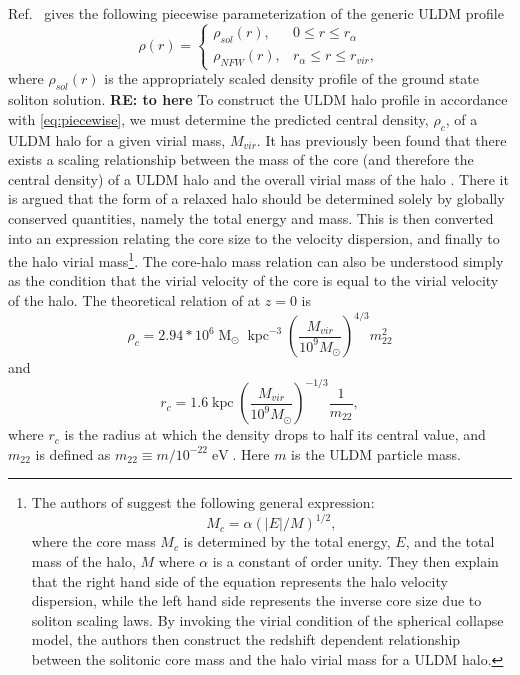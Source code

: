 \documentclass[a4paper,11pt]{article}
\newcommand{\re}[1]{{{\bf \color{green} RE: #1}}}
\begin{document}
\

 
Ref.~\cite{Robles:2018fur} gives the following piecewise parameterization of the generic ULDM profile 
%
\begin{equation}\label{eq:piecewise}
     \rho(r)=
    \begin{cases}
      \rho_{sol}(r), & 0\leq r \leq r_{\alpha} \\
      \rho_{NFW}(r), & r_{\alpha}\leq r \leq r_{vir},
    \end{cases}
\end{equation}
%
where $\rho_{sol}(r)$ is the appropriately scaled density profile of the ground state soliton solution.   \re{to here}
To construct the ULDM halo profile in accordance with \ref{eq:piecewise}, we must determine the predicted central density, $\rho_c$, of a ULDM halo for a given virial mass, $M_{vir}$.  It has previously been found that there exists a scaling relationship between the mass of the core (and therefore the central density) of a ULDM halo and the overall virial mass of the halo \cite{Schive:2014hza}. There it is argued that the form of a relaxed halo should be determined solely by globally conserved quantities, namely the total energy and mass. This is then converted into an expression relating the core size to the velocity dispersion, and finally to the halo virial mass\footnote{The authors of \cite{Schive:2014hza} suggest the following general expression:
\begin{equation}
    M_c = \alpha \left(\vert E\vert/M\right)^{1/2},
\end{equation}
where the core mass $M_c$ is determined by the total energy, $E$, and the total mass of the halo, $M$ where $\alpha$ is a constant of order unity. They then explain that the right hand side of the equation represents the halo velocity dispersion, while the left hand side  represents the inverse core size due to soliton scaling laws. By invoking the virial condition of the spherical collapse model, the authors then  construct the redshift dependent relationship between the solitonic core mass and the halo virial mass for a ULDM halo.}. The core-halo mass relation can also be understood simply as the condition that the virial velocity of the core is equal to the virial velocity of the halo. The theoretical relation of \cite{Schive:2014hza} at $z = 0$ is  
%
\begin{equation}\label{eq:central_dens}
    \rho_c = 2.94*10^6 \operatorname{M}_{\odot}\operatorname{kpc}^{-3}\left(\frac{M_{vir}}{10^9 M_{\odot}}\right)^{4/3}m_{22}^{2}
\end{equation}
and 
\begin{equation}
    r_c = 1.6 \operatorname{kpc}\left(\frac{M_{vir}}{10^9 M_{\odot}}\right)^{-1/3}\frac{1}{m_{22}},
\end{equation}
where $r_c$ is the radius at which the density drops to half its central value, and $m_{22}$ is defined as $m_{22} \equiv m / 10^{-22} \operatorname{eV}$. Here $m$ is the ULDM particle mass. 
\end{document}
